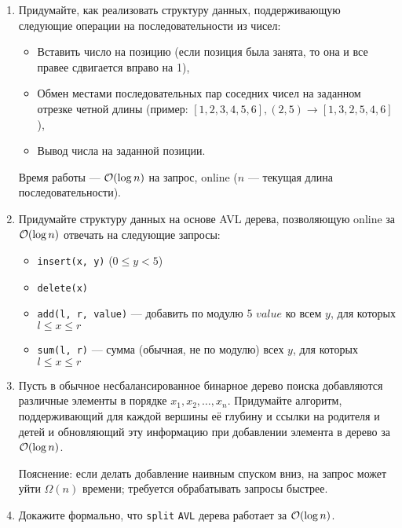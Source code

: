 \begin{enumerate}
  \item
    Придумайте, как реализовать структуру данных, поддерживающую следующие операции на последовательности из чисел:
    \begin{itemize}
      \item Вставить число на позицию (если позиция была занята, то она и все правее
        сдвигается вправо на 1),
      \item Обмен местами последовательных пар соседних чисел на заданном отрезке четной длины
             (пример: $[1,2,3,4,5,6], (2,5) \rightarrow [1,3,2,5,4,6]$),
      \item Вывод числа на заданной позиции.
    \end{itemize}
    Время работы --- $\mathcal{O}(\log{n})$ на запрос, online ($n$ --- текущая длина последовательности).

  \item {}
    Придумайте структуру данных на основе AVL дерева, позволяющую online за $\mathcal{O}(\log n)$ отвечать на следующие запросы:
	\begin{itemize}
	  \item \texttt{insert(x, y)} ($0 \le y < 5$)
      \item \texttt{delete(x)}
      \item \texttt{add(l, r, value)} --- добавить по модулю 5 $value$ ко
        всем $y$, для которых $l \le x \le r$
      \item \texttt{sum(l, r)} --- сумма (обычная, не по модулю) всех $y$,
        для которых $l \le x \le r$
    \end{itemize}

  \item
    Пусть в обычное несбалансированное бинарное дерево поиска добавляются различные элементы в порядке $x_1, x_2, \dots, x_n$. 
    Придумайте алгоритм, поддерживающий для каждой вершины её глубину и ссылки на родителя и детей
    и обновляющий эту информацию при добавлении элемента в дерево за $\mathcal{O}(\log n)$.
    
    Пояснение: если делать добавление наивным спуском вниз, на запрос может уйти $\Omega(n)$ времени; требуется обрабатывать запросы быстрее.

  \item {}
    Докажите формально, что \texttt{split} \texttt{AVL} дерева работает за $\mathcal{O}(\log{n})$.


\end{enumerate}
